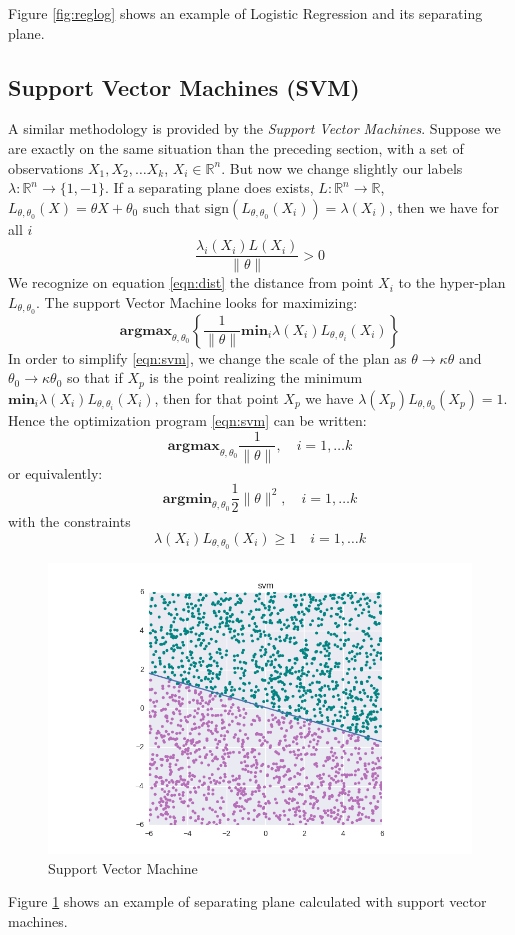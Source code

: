 \documentclass[DIV=calc, paper=a4, fontsize=11pt, twocolumn]{scrartcl}
\begin{document}
Figure \ref{fig:reglog} shows an example of Logistic Regression and its separating plane.
\subsection{Support Vector Machines (SVM)}
A similar methodology is provided by the \emph{Support Vector Machines}. Suppose we are exactly on the same situation than the preceding section, with a set of observations $X_1, X_2, \ldots X_k$, $X_i \in \mathbb{R}^n$. But now we change slightly our labels $\lambda : \mathbb{R}^n \to \{1, -1\}$. If a separating plane does exists, $L: \mathbb{R}^n \to \mathbb{R}$, $L_{\theta, \theta_0}(X) = \theta X + \theta_0$ such that $\textrm{sign}(L_{\theta, \theta_0}(X_i)) = \lambda(X_i)$, then we have for all $i$
\begin{equation}
\frac{\lambda_i(X_i)L(X_i)}{\|\theta\|}>0
\label{eqn:dist}
\end{equation}
We recognize on equation \ref{eqn:dist} the distance from point  $X_i$ to the hyper-plan $L_{\theta, \theta_0}$. The support Vector Machine looks for maximizing:
\begin{equation}
\textbf{argmax}_{\theta, \theta_0} \left\{ \frac{1}{\|\theta\|} \textbf{min}_i\lambda(X_i)L_{\theta, \theta_i}(X_i)\right\}
\label{eqn:svm}
\end{equation}
In order to simplify \ref{eqn:svm}, we change the scale of the plan as $\theta \to \kappa \theta$ and $\theta_0 \to \kappa \theta_0$ so that if $X_p$ is the point realizing the minimum $\textbf{min}_i\lambda(X_i)L_{\theta, \theta_i}(X_i)$, then for that point $X_p$ we have $\lambda(X_p)L_{\theta, \theta_0}(X_p) = 1$. Hence the optimization program \ref{eqn:svm} can be written:
$$\textbf{argmax}_{\theta, \theta_0}  \frac{1}{\|\theta\|}, \quad i = 1, \dots k$$
or equivalently: 
$$\textbf{argmin}_{\theta, \theta_0}  \frac{1}{2}\|\theta\|^2, \quad i = 1, \dots k$$
with the constraints
$$ \lambda(X_i)L_{\theta, \theta_0}(X_i) \geq 1 \quad i = 1, \ldots k$$
\begin{figure}
  \centering
    \includegraphics[width=\linewidth]{svm}
  \caption{Support Vector Machine}
  \label{fig:svm}
\end{figure}
Figure \ref{fig:svm} shows an example of separating plane calculated with support vector machines.
\end{document}
